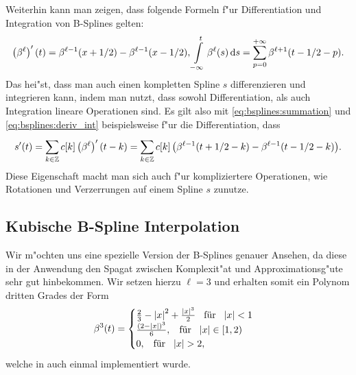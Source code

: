 Weiterhin kann man zeigen, dass folgende Formeln f"ur Differentiation und Integration von B-Splines gelten:
\begin{equation}\label{eq:bsplines:deriv_int}
    \left(\beta^\ell\right)^\prime(t) =
        \beta^{\ell-1}(x + 1/2) - \beta^{\ell-1}(x - 1/2), 
    {\int\limits_{-\infty}^{t}{\beta^\ell(s)}\,\mathrm{d}{s}} = 
        {\sum\limits_{p = 0}^{+\infty}{\beta^{\ell+1}(t - 1/2 - p)}}.
\end{equation}
Das hei"st, dass man auch einen kompletten Spline $s$ differenzieren und integrieren kann, indem man nutzt, dass sowohl Differentiation, als auch Integration lineare Operationen sind. 
Es gilt also mit \eqref{eq:bsplines:summation} und \eqref{eq:bsplines:deriv_int} beispielsweise f"ur die Differentiation, dass
\begin{equation}
    s^\prime(t) = {\sum\limits_{k \in \mathbb{Z}}^{}{
        c[k] \left(\beta^{\ell}\right)^\prime(t - k)
    }}
    = {\sum\limits_{k \in \mathbb{Z}}^{}{
        c[k]\left(
            \beta^{\ell-1}(t + 1/2 - k) - \beta^{\ell-1}(t - 1/2 - k)
        \right)
    }}.
\end{equation}
%
Diese Eigenschaft macht man sich auch f"ur kompliziertere Operationen, wie Rotationen und Verzerrungen auf einem Spline $s$ zunutze.
%
%
\subsection{Kubische B-Spline Interpolation}
%
%
Wir m"ochten uns eine spezielle Version der B-Splines genauer Ansehen, da diese in der Anwendung den Spagat zwischen Komplexit"at und Approximationsg"ute sehr gut hinbekommen. 
Wir setzen hierzu $\ell=3$ und erhalten somit ein Polynom dritten Grades der Form
\begin{equation}\label{eq:bsplines:explicit_eval}
    \beta^3(t) = \begin{cases}
        \frac 23 - {\left| x \right|}^2 + \frac{{\left| x \right|}^3}{2} {\hspace{3mm} \text{f\"ur} \hspace{3mm}} {\left| x \right|} < 1\\
        \frac{(2 - {\left| x \right|})^3}{6}, {\hspace{3mm} \text{f\"ur} \hspace{3mm}} {\left| x \right|} \in [1, 2) \\
        0, {\hspace{3mm} \text{f\"ur} \hspace{3mm}} {\left| x \right|} > 2,
    \end{cases}
\end{equation}
welche in  auch einmal implementiert wurde. 

\begin{listing}
\inputminted[firstline=4]{python}{code/bsplines_eval.py}
\label{py:bsplines:eval}            
\end{listing}

